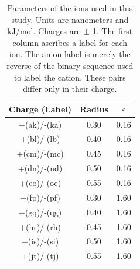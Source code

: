 \begin{tatb}
\begin{table}
 \begin{center}
  \begin{tabular}{ccc}
   \hline
   \hline
    Charge (Label) &   Radius   &   $\varepsilon$  \\
   \hline
    +(ak)/-(ka)    &   0.30     &    0.16          \\
    +(bl)/-(lb)    &   0.40     &    0.16          \\
    +(cm)/-(mc)    &   0.45     &    0.16          \\
    +(dn)/-(nd)    &   0.50     &    0.16          \\
    +(eo)/-(oe)    &   0.55     &    0.16          \\
    +(fp)/-(pf)    &   0.30     &    1.60          \\
    +(gq)/-(qg)    &   0.40     &    1.60          \\
    +(hr)/-(rh)    &   0.45     &    1.60          \\
    +(is)/-(si)    &   0.50     &    1.60          \\
    +(jt)/-(tj)    &   0.55     &    1.60          \\
   \hline
   \hline
  \end{tabular}
  \caption[Labels and parameters assigned to fictitious ions]{\label{tab:ion_labels}Parameters of the ions used in this study. Units are nanometers and kJ/mol. 
  Charges are $\pm$ 1. The first column ascribes a label for each ion. The anion label is merely the reverse of the binary sequence used to label the cation. These 
  pairs differ only in their charge.}
 \end{center}
\end{table}


\end{tatb}
